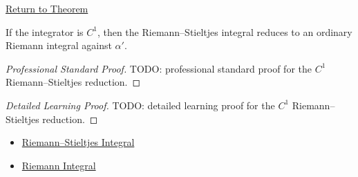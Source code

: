 \newpage
{}
\label{prf:rs-c1-reduction}

\begin{remark*}[Return]
\hyperref[thm:rs-c1-reduction]{Return to Theorem}
\end{remark*}

\begin{theorem*}
If the integrator is \(C^1\), then the Riemann--Stieltjes integral reduces to
an ordinary Riemann integral against \(\alpha'\).
\end{theorem*}

\begin{proof}[Professional Standard Proof]
\LRAProofBodyStart
TODO: professional standard proof for the \(C^1\) Riemann--Stieltjes reduction.
\end{proof}

\begin{proof}[Detailed Learning Proof]
\LRAProofBodyStart
TODO: detailed learning proof for the \(C^1\) Riemann--Stieltjes reduction.
\end{proof}

\begin{remark*}
\end{remark*}

\begin{dependencies}
\begin{itemize}
  \item \hyperref[def:riemann-stieltjes-integral]{Riemann--Stieltjes Integral}
  \item \hyperref[def:riemann-integral]{Riemann Integral}
\end{itemize}
\end{dependencies}

\clearpage
